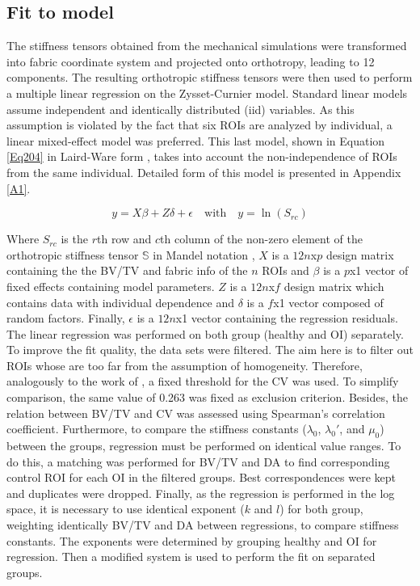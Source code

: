 \documentclass[a4paper,fleqn]{DC_ArtStyle}
\begin{document}
\subsection{Fit to model}
The stiffness tensors obtained from the mechanical simulations were transformed into fabric coordinate system and projected onto orthotropy, leading to 12 components. The resulting orthotropic stiffness tensors were then used to perform a multiple linear regression on the Zysset-Curnier model. Standard linear models assume independent and identically distributed (iid) variables. As this assumption is violated by the fact that six ROIs are analyzed by individual, a linear mixed-effect model was preferred. This last model, shown in Equation \ref{Eq204} in Laird-Ware form \cite{Laird1982}, takes into account the non-independence of ROIs from the same individual. Detailed form of this model is presented in Appendix \ref{A1}.

\begin{equation}
	y = X \beta + Z \delta + \epsilon \quad \text{with} \quad y = \ln(S_{rc})
	\label{Eq204}
\end{equation}

Where $S_{rc}$ is the $r$th row and $c$th column of the non-zero element of the orthotropic stiffness tensor $\mathbb{S}$ in Mandel notation \cite{MANDEL1965}, $X$ is a $12n$x$p$ design matrix containing the the BV/TV and fabric info of the $n$ ROIs and $\beta$ is a $p$x1 vector of fixed effects containing model parameters. $Z$ is a $12n$x$f$ design matrix which contains data with individual dependence and $\delta$ is a $f$x1 vector composed of random factors. Finally, $\epsilon$ is a $12n$x1 vector containing the regression residuals.\\

The linear regression was performed on both group (healthy and OI) separately. To improve the fit quality, the data sets were filtered. The aim here is to filter out ROIs whose are too far from the assumption of homogeneity. Therefore, analogously to the work of \citeauthor{Panyasantisuk2015}\cite{Panyasantisuk2015}, a fixed threshold for the CV was used. To simplify comparison, the same value of 0.263 was fixed as exclusion criterion. Besides, the relation between BV/TV and CV was assessed using Spearman's correlation coefficient. Furthermore, to compare the stiffness constants ($\lambda_0$, $\lambda_0'$, and $\mu_0$) between the groups, regression must be performed on identical value ranges. To do this, a matching was performed for BV/TV and DA to find corresponding control ROI for each OI in the filtered groups. Best correspondences were kept and duplicates were dropped. Finally, as the regression is performed in the log space, it is necessary to use identical exponent ($k$ and $l$) for both group, weighting identically BV/TV and DA between regressions, to compare stiffness constants. The exponents were determined by grouping healthy and OI for regression. Then a modified system is used to perform the fit on separated groups.\\
\end{document}
